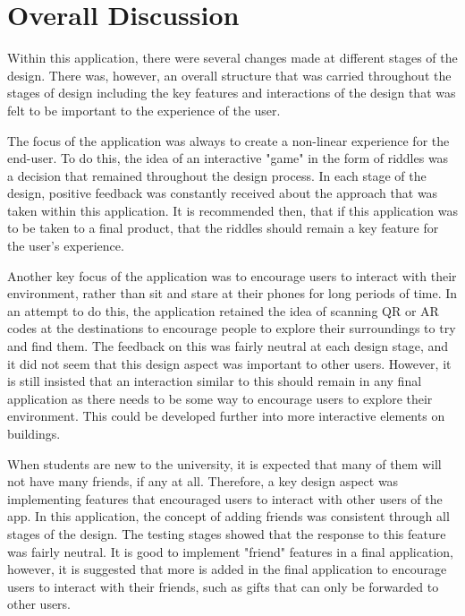 \documentclass[10pt,twocolumn]{article} %
\begin{document}
\section*{Overall Discussion}
Within this application, there were several changes made at different stages of the design. There was, however, an overall structure that was carried throughout the stages of design including the key features and interactions of the design that was felt to be important to the experience of the user.

The focus of the application was always to create a non-linear experience for the end-user. To do this, the idea of an interactive "game" in the form of riddles was a decision that remained throughout the design process. In each stage of the design, positive feedback was constantly received about the approach that was taken within this application. It is recommended then, that if this application was to be taken to a final product, that the riddles should remain a key feature for the user's experience.

Another key focus of the application was to encourage users to interact with their environment, rather than sit and stare at their phones for long periods of time. In an attempt to do this, the application retained the idea of scanning QR or AR codes at the destinations to encourage people to explore their surroundings to try and find them. The feedback on this was fairly neutral at each design stage, and it did not seem that this design aspect was important to other users. However, it is still insisted that an interaction similar to this should remain in any final application as there needs to be some way to encourage users to explore their environment. This could be developed further into more interactive elements on buildings.

When students are new to the university, it is expected that many of them will not have many friends, if any at all. Therefore, a key design aspect was implementing features that encouraged users to interact with other users of the app. In this application, the concept of adding friends was consistent through all stages of the design. The testing stages showed that the response to this feature was fairly neutral. It is good to implement "friend" features in a final application, however, it is suggested that more is added in the final application to encourage users to interact with their friends, such as gifts that can only be forwarded to other users.
\end{document}
